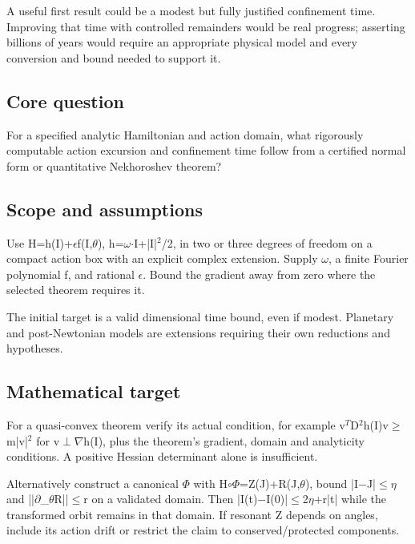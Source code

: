 \documentclass[
  11pt,
]{article}
\begin{document}
A useful first result could be a modest but fully justified confinement
time. Improving that time with controlled remainders would be real
progress; asserting billions of years would require an appropriate
physical model and every conversion and bound needed to support it.

\subsection{Core question}

For a specified analytic Hamiltonian and action domain, what rigorously
computable action excursion and confinement time follow from a certified
normal form or quantitative Nekhoroshev theorem?

\subsection{Scope and assumptions}

Use H=h(I)+\ensuremath{\epsilon}f(I,\ensuremath{\theta}),
h=\ensuremath{\omega}\ensuremath{\cdot}I+|I|\ensuremath{{}^{2}}/2, in
two or three degrees of freedom on a compact action box with an explicit
complex extension. Supply \ensuremath{\omega}, a finite Fourier
polynomial f, and rational \ensuremath{\epsilon}. Bound the gradient
away from zero where the selected theorem requires it.

The initial target is a valid dimensional time bound, even if modest.
Planetary and post-Newtonian models are extensions requiring their own
reductions and hypotheses.

\subsection{Mathematical target}

For a quasi-convex theorem verify its actual condition, for example
v\ensuremath{{}^{T}}D\ensuremath{{}^{2}}h(I)v\ensuremath{\ge}m|v|\ensuremath{{}^{2}}
for v\ensuremath{\perp}\ensuremath{\nabla}h(I), plus the theorem's
gradient, domain and analyticity conditions. A positive Hessian
determinant alone is insufficient.

Alternatively construct a canonical \ensuremath{\Phi} with
H\ensuremath{\circ}\ensuremath{\Phi}=Z(J)+R(J,\ensuremath{\theta}),
bound |I\ensuremath{-}J|\ensuremath{\le}\ensuremath{\eta} and
||\ensuremath{\partial}\_\ensuremath{\theta}R||\ensuremath{\le}r on a
validated domain. Then
|I(t)\ensuremath{-}I(0)|\ensuremath{\le}2\ensuremath{\eta}+r|t| while
the transformed orbit remains in that domain. If resonant Z depends on
angles, include its action drift or restrict the claim to
conserved/protected components.
\end{document}
